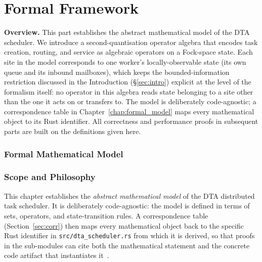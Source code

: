 \documentclass[11pt,a4paper]{article}
\newcommand{\partbreak}{\clearpage\phantomsection}
\newcommand{\code}[1]{\texttt{#1}}
\begin{document}
\partbreak
\part{Formal Framework}

\bigskip
\noindent\textbf{Overview.}
This part establishes the abstract mathematical model of the DTA scheduler.
We introduce a second-quantisation operator algebra that encodes task creation,
routing, and service as algebraic operators on a Fock-space state.
Each site in the model corresponds to one worker's locally-observable
state (its own queue and its inbound mailboxes), which keeps the
bounded-information restriction discussed in the Introduction
(\S\ref{sec:intro}) explicit at the level of the formalism itself: no
operator in this algebra reads state belonging to a site other than the
one it acts on or transfers to.
The model is deliberately code-agnostic; a correspondence table in
Chapter~\ref{chap:formal_model} maps every mathematical object to its
Rust identifier.  All correctness and performance proofs in subsequent
parts are built on the definitions given here.



\section*{Formal Mathematical Model}
\label{chap:formal_model}
\setcounter{section}{0}


\section{Scope and Philosophy}

This chapter establishes the \emph{abstract mathematical model} of
the DTA distributed task scheduler.  It is deliberately
code-agnostic: the model is defined in terms of sets, operators, and
state-transition rules.  A correspondence table (Section~\ref{sec:corr})
then maps every mathematical object back to the specific Rust
identifier in \code{src/dta\_scheduler.rs} from which it is derived,
so that proofs in the sub-modules can cite both the mathematical
statement and the concrete code artifact that instantiates it~\cite{dtact}.
\end{document}

